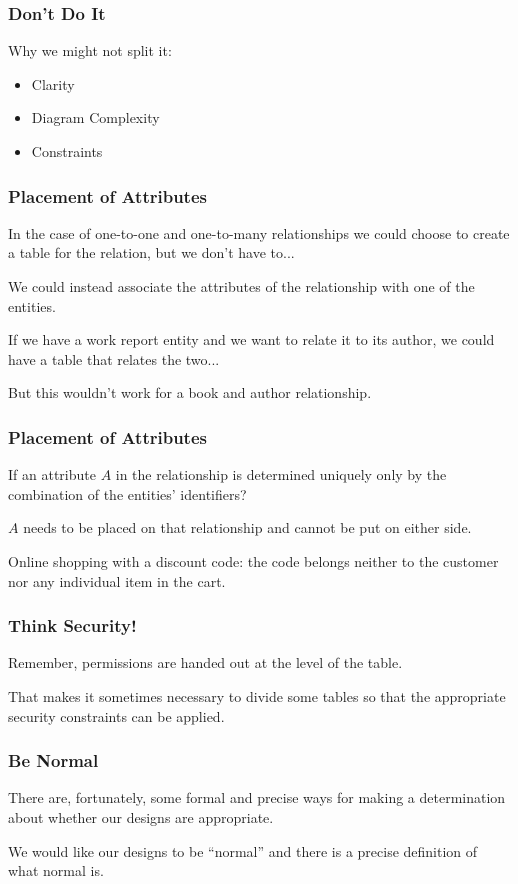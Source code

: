 \begin{frame}
\frametitle{Don't Do It}

Why we might not split it:

\begin{itemize}
	\item Clarity
	\item Diagram Complexity
	\item Constraints
\end{itemize}

\end{frame}


\begin{frame}
\frametitle{Placement of Attributes}

In the case of one-to-one and one-to-many relationships we could choose to create a table for the relation, but we don't have to... 

We could instead associate the attributes of the relationship with one of the entities. 

If we have a work report entity and we want to relate it to its author, we could have a table that relates the two...

But this wouldn't work for a book and author relationship.

\end{frame}



\begin{frame}
\frametitle{Placement of Attributes}

If an attribute $A$ in the relationship is determined uniquely only by the combination of the entities' identifiers? 

$A$ needs to be placed on that relationship and cannot be put on either side. 

Online shopping with a discount code: the code belongs neither to the customer nor any individual item in the cart.



\end{frame}


\begin{frame}
\frametitle{Think Security!}

Remember, permissions are handed out at the level of the table.

That makes it sometimes necessary to divide some tables so that the appropriate security constraints can be applied. 


\end{frame}


\begin{frame}
\frametitle{Be Normal}

 There are, fortunately, some formal and precise ways for making a determination about whether our designs are appropriate. 
 
 We would like our designs to be ``normal'' and there is a precise definition of what normal is. 


\end{frame}






